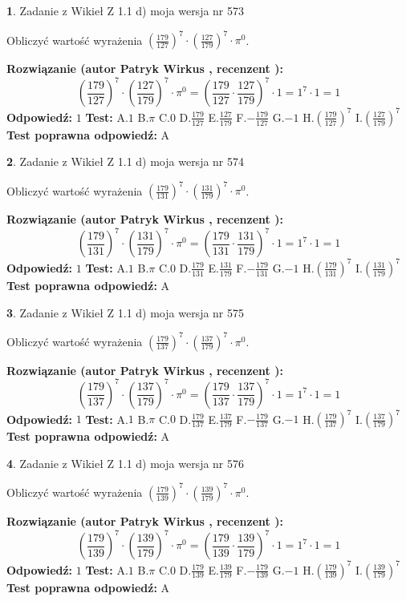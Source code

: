 \documentclass[12pt, a4paper]{article}
\theoremstyle{definition} %
\newtheorem{zad}{}
\newcommand{\zadStart}[1]{\begin{zad}#1\newline}
\newcommand{\zadStop}{\end{zad}}
\newcommand{\rozwStart}[2]{\noindent \textbf{Rozwiązanie (autor #1 , recenzent #2): }\newline}
\newcommand{\rozwStop}{\newline}
\newcommand{\odpStart}{\noindent \textbf{Odpowiedź:}\newline}
\newcommand{\odpStop}{\newline}
\newcommand{\testStart}{\noindent \textbf{Test:}\newline}
\newcommand{\testStop}{\newline}
\newcommand{\kluczStart}{\noindent \textbf{Test poprawna odpowiedź:}\newline}
\newcommand{\kluczStop}{\newline}
\begin{document}
\zadStart{Zadanie z Wikieł Z 1.1 d) moja wersja nr 573}

Obliczyć wartość wyrażenia $(\frac{179}{127})^{7} \cdot (\frac{127}{179})^{7} \cdot \pi^{0}$.
\zadStop
\rozwStart{Patryk Wirkus}{}
$$(\frac{179}{127})^{7} \cdot (\frac{127}{179})^{7} \cdot \pi^{0} = (\frac{179}{127} \cdot \frac{127}{179})^{7} \cdot 1 = 1^{7} \cdot 1 = 1$$
\rozwStop
\odpStart
$1$
\odpStop
\testStart
A.$1$ B.$\pi$ C.$0$ D.$\frac{179}{127}$ E.$\frac{127}{179}$
F.$-\frac{179}{127}$ G.$-1$
H.$(\frac{179}{127})^{7}$
I.$(\frac{127}{179})^{7}$
\testStop
\kluczStart
A
\kluczStop



\zadStart{Zadanie z Wikieł Z 1.1 d) moja wersja nr 574}

Obliczyć wartość wyrażenia $(\frac{179}{131})^{7} \cdot (\frac{131}{179})^{7} \cdot \pi^{0}$.
\zadStop
\rozwStart{Patryk Wirkus}{}
$$(\frac{179}{131})^{7} \cdot (\frac{131}{179})^{7} \cdot \pi^{0} = (\frac{179}{131} \cdot \frac{131}{179})^{7} \cdot 1 = 1^{7} \cdot 1 = 1$$
\rozwStop
\odpStart
$1$
\odpStop
\testStart
A.$1$ B.$\pi$ C.$0$ D.$\frac{179}{131}$ E.$\frac{131}{179}$
F.$-\frac{179}{131}$ G.$-1$
H.$(\frac{179}{131})^{7}$
I.$(\frac{131}{179})^{7}$
\testStop
\kluczStart
A
\kluczStop



\zadStart{Zadanie z Wikieł Z 1.1 d) moja wersja nr 575}

Obliczyć wartość wyrażenia $(\frac{179}{137})^{7} \cdot (\frac{137}{179})^{7} \cdot \pi^{0}$.
\zadStop
\rozwStart{Patryk Wirkus}{}
$$(\frac{179}{137})^{7} \cdot (\frac{137}{179})^{7} \cdot \pi^{0} = (\frac{179}{137} \cdot \frac{137}{179})^{7} \cdot 1 = 1^{7} \cdot 1 = 1$$
\rozwStop
\odpStart
$1$
\odpStop
\testStart
A.$1$ B.$\pi$ C.$0$ D.$\frac{179}{137}$ E.$\frac{137}{179}$
F.$-\frac{179}{137}$ G.$-1$
H.$(\frac{179}{137})^{7}$
I.$(\frac{137}{179})^{7}$
\testStop
\kluczStart
A
\kluczStop



\zadStart{Zadanie z Wikieł Z 1.1 d) moja wersja nr 576}

Obliczyć wartość wyrażenia $(\frac{179}{139})^{7} \cdot (\frac{139}{179})^{7} \cdot \pi^{0}$.
\zadStop
\rozwStart{Patryk Wirkus}{}
$$(\frac{179}{139})^{7} \cdot (\frac{139}{179})^{7} \cdot \pi^{0} = (\frac{179}{139} \cdot \frac{139}{179})^{7} \cdot 1 = 1^{7} \cdot 1 = 1$$
\rozwStop
\odpStart
$1$
\odpStop
\testStart
A.$1$ B.$\pi$ C.$0$ D.$\frac{179}{139}$ E.$\frac{139}{179}$
F.$-\frac{179}{139}$ G.$-1$
H.$(\frac{179}{139})^{7}$
I.$(\frac{139}{179})^{7}$
\testStop
\kluczStart
A
\kluczStop
\end{document}
